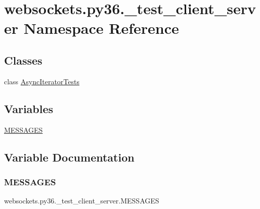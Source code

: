 \hypertarget{namespacewebsockets_1_1py36_1_1__test__client__server}{}\section{websockets.\+py36.\+\_\+test\+\_\+client\+\_\+server Namespace Reference}
\label{namespacewebsockets_1_1py36_1_1__test__client__server}
\subsection*{Classes}
\begin{DoxyCompactItemize}
\item 
class \hyperlink{classwebsockets_1_1py36_1_1__test__client__server_1_1_async_iterator_tests}{Async\+Iterator\+Tests}
\end{DoxyCompactItemize}
\subsection*{Variables}
\begin{DoxyCompactItemize}
\item 
\hyperlink{namespacewebsockets_1_1py36_1_1__test__client__server_a403524a29ea6ed43c0dfa4fd58c841e0}{M\+E\+S\+S\+A\+G\+ES}
\end{DoxyCompactItemize}


\subsection{Variable Documentation}
\mbox{\label{namespacewebsockets_1_1py36_1_1__test__client__server_a403524a29ea6ed43c0dfa4fd58c841e0}} 
\subsubsection{\texorpdfstring{M\+E\+S\+S\+A\+G\+ES}{MESSAGES}}
{\footnotesize\ttfamily websockets.\+py36.\+\_\+test\+\_\+client\+\_\+server.\+M\+E\+S\+S\+A\+G\+ES}

